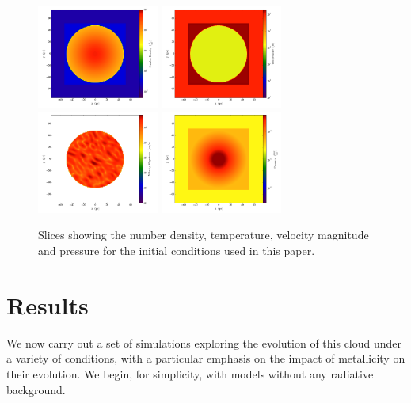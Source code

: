 \documentclass[useAMS,usenatbib]{mn2e}
\begin{document}
\begin{figure}
\begin{center}
\includegraphics[width=4.0cm]{Images/Initial_number_density}
\includegraphics[width=4.0cm]{Images/Initial_temperature}
\includegraphics[width=4.0cm]{Images/Initial_velocity_magnitude}
\includegraphics[width=4.0cm]{Images/Initial_pressure}
\end{center}
\caption{\label{fig:initial_setup} Slices showing the number density, temperature, velocity magnitude
and pressure for the initial conditions used in this paper. }
\end{figure}

% 
\section{Results}
\label{sec:results}

We now carry out a set of simulations exploring the evolution of this cloud under a variety of conditions, with a particular emphasis on the impact of metallicity on their evolution.  We begin, for simplicity, with models without any radiative background.
\end{document}
